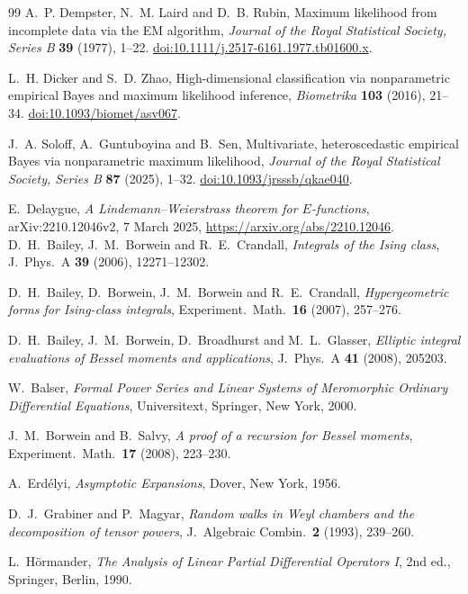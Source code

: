 \documentclass[11pt,a4paper]{article}
\theoremstyle{definition}
\theoremstyle{remark}
\numberwithin{equation}{section}
\begin{document}
\begin{thebibliography}{99}
A.~P. Dempster, N.~M. Laird and D.~B. Rubin,
Maximum likelihood from incomplete data via the EM algorithm,
\emph{Journal of the Royal Statistical Society, Series B}
\textbf{39} (1977), 1--22.
\href{https://doi.org/10.1111/j.2517-6161.1977.tb01600.x}
{doi:10.1111/j.2517-6161.1977.tb01600.x}.

L.~H. Dicker and S.~D. Zhao,
High-dimensional classification via nonparametric empirical Bayes and
maximum likelihood inference,
\emph{Biometrika} \textbf{103} (2016), 21--34.
\href{https://doi.org/10.1093/biomet/asv067}
{doi:10.1093/biomet/asv067}.

J.~A. Soloff, A.~Guntuboyina and B.~Sen,
Multivariate, heteroscedastic empirical Bayes via nonparametric maximum
likelihood,
\emph{Journal of the Royal Statistical Society, Series B}
\textbf{87} (2025), 1--32.
\href{https://doi.org/10.1093/jrsssb/qkae040}
{doi:10.1093/jrsssb/qkae040}.

E.~Delaygue, \emph{A Lindemann--Weierstrass theorem for $E$-functions},
arXiv:2210.12046v2, 7 March 2025,
\url{https://arxiv.org/abs/2210.12046}.
D.~H.~Bailey, J.~M.~Borwein and R.~E.~Crandall, \emph{Integrals of the Ising class}, J.\ Phys.\ A \textbf{39} (2006), 12271--12302.

D.~H.~Bailey, D.~Borwein, J.~M.~Borwein and R.~E.~Crandall, \emph{Hypergeometric forms for Ising-class integrals}, Experiment.\ Math.\ \textbf{16} (2007), 257--276.

D.~H.~Bailey, J.~M.~Borwein, D.~Broadhurst and M.~L.~Glasser, \emph{Elliptic integral evaluations of Bessel moments and applications}, J.\ Phys.\ A \textbf{41} (2008), 205203.

W.~Balser, \emph{Formal Power Series and Linear Systems of Meromorphic Ordinary Differential Equations}, Universitext, Springer, New York, 2000.

J.~M.~Borwein and B.~Salvy, \emph{A proof of a recursion for Bessel moments}, Experiment.\ Math.\ \textbf{17} (2008), 223--230.

A.~Erd\'elyi, \emph{Asymptotic Expansions}, Dover, New York, 1956.

D.~J.~Grabiner and P.~Magyar, \emph{Random walks in Weyl chambers and the decomposition of tensor powers}, J.\ Algebraic Combin.\ \textbf{2} (1993), 239--260.

L.~H\"ormander, \emph{The Analysis of Linear Partial Differential Operators I}, 2nd ed., Springer, Berlin, 1990.


\end{thebibliography}
\end{document}
